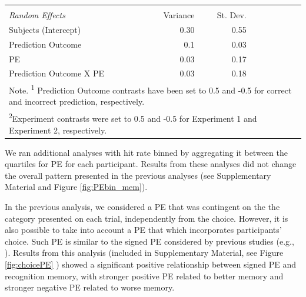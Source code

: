 \documentclass[a4paper,12pt]{article}
\begin{document}
\begin{landscape}
\begin{table}
{\begin{tabular} {l r r r r r r}
& & & & & &  \\
  \textit{ Random Effects} & Variance  & St. Dev.\\\cmidrule{1-3}
Subjects (Intercept) & 0.30 & 0.55 \\
Prediction Outcome & 0.1 & 0.03 \\
PE & 0.03 & 0.17 \\
Prediction Outcome X PE & 0.03 & 0.18 \\
\bottomrule
\multicolumn{7}{l}{\footnotesize Note. \textsuperscript{1} Prediction Outcome contrasts have been set to 0.5 and -0.5 for correct and incorrect prediction, respectively.}\\
\multicolumn{7}{l}{\footnotesize \textsuperscript{2}Experiment contrasts were set to 0.5 and -0.5 for Experiment 1 and Experiment 2, respectively.}

    \end{tabular}
}
\label{tab:Main}

    \end{table}

\end{landscape}

\pagestyle{plain}



 

We ran additional analyses with hit rate binned by aggregating it between the quartiles for PE for each participant. Results from these analyses did not change the overall pattern presented in the previous analyses (see Supplementary Material and Figure \ref{fig:PEbin_mem}).\par
In the previous analysis, we considered a PE that was contingent on the the category presented on each trial, independently from the choice. However, it is also possible to take into account a PE that which incorporates participants' choice. Such PE is similar to the signed PE considered by previous studies (e.g., \cite{de2018signed, Jang2019}). Results from this analysis (included in Supplementary Material, see Figure \ref{fig:choicePE}
) showed a significant positive relationship between signed PE and recognition memory, with stronger positive PE related to better memory and stronger negative PE related to worse memory. \par
 
\end{document}
